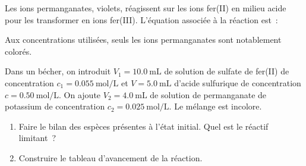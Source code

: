 Les ions permanganates, violets, réagissent sur les ions fer(II) en milieu acide
pour les transformer en ions fer(III). L'équation associée à la réaction est~:
\begin{center}
\end{center}
Aux concentrations utilisées, seuls les ions permanganates sont notablement
colorés.

Dans un bécher, on introduit $V_{1}=\qty{10.0}{\mL}$ de solution de sulfate de
fer(II) de concentration $c_{1}=\qty{0.055}{\mol\per\L}$ et $V=\qty{5.0}{\mL}$
d'acide sulfurique de concentration $c=\qty{0.50}{\mol\per\L}$. On ajoute
$V_{2}=\qty{4.0}{\mL}$ de solution de permanganate de potassium de concentration
$c_{2}=\qty{0.025}{\mol\per\L}$. Le mélange est incolore.

\begin{enumerate}
    \item Faire le bilan des espèces présentes à l'état initial. Quel est le
          réactif limitant~?
    \item Construire le tableau d'avancement de la réaction.
\end{enumerate}

